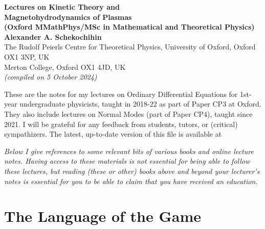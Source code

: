 \documentclass[twoside,a4paper,12pt]{article} %
\begin{document}
\begin{center}
    \thispagestyle{firstpage} %
    \vspace*{10pt} %
    {\LARGE \textbf{Lectures on Kinetic Theory and\\ Magnetohydrodynamics of Plasmas}} \\[1em]
    {\small{\textbf{(Oxford MMathPhys/MSc in Mathematical and Theoretical Physics)}}} \\[1.5em]
    {\large \textbf{ Alexander A. Schekochihin}} \\[0.5em]
    {\small The Rudolf Peierls Centre for Theoretical Physics, University of Oxford, Oxford OX1 3NP, UK}\\
    {\small Merton College, Oxford OX1 4JD, UK}\\[1em]
    {\small \textit{(compiled on 5 October 2024)}}
\end{center}

\noindent These are the notes for my lectures on Ordinary Differential Equations for 1st-year
undergraduate physicists, taught in 2018-22 as part of Paper CP3 at Oxford. They also
include lectures on Normal Modes (part of Paper CP4), taught since 2021. I will be
grateful for any feedback from students, tutors, or (critical) sympathizers. The latest,
up-to-date version of this file is available at\\

\noindent\makebox[\linewidth]{\rule{\linewidth}{0.4pt}}
\begin{center}
\parbox{1\textwidth}{
\emph{Below I give references to some relevant bits of various books and online lecture notes. Having access to these materials is not essential for being able to follow these lectures, but reading (these or other) books above and beyond your lecturer’s notes is essential for you to be able to claim that you have received an education.}
}
\end{center}
\noindent\makebox[\linewidth]{\rule{\linewidth}{0.4pt}}
\tableofcontents

\newpage
\begin{flushright}
    \blindtext[1]
\end{flushright}

\section{The Language of the Game}
\end{document}
